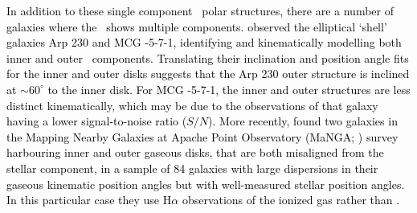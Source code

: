 \documentclass[fleqn,usenatbib]{mnras}
\newcommand{\hi}{\text{H\,\sc{i}}}
\newcommand{\KS}[1]{\textcolor{black}{#1}}
\begin{document}


\textcolor{black}{In addition to these single component \hi\ polar structures, there are a number of galaxies where the \hi\ shows multiple components.  \citet{Schiminovich2013} observed the elliptical `shell' galaxies Arp 230 and MCG -5-7-1, \KS{identifying and kinematically modelling both inner and outer \hi\ components.}  Translating their inclination and position angle fits for the inner and outer disks suggests that the Arp 230 outer structure is inclined at $\sim 60^{\circ}$ to the inner disk. For MCG -5-7-1, the inner and outer structures are less distinct kinematically, which may be due to the observations of that galaxy having a lower signal-to-noise ratio ($S/N$).  More recently, \citet{Cao2022} found two galaxies in the Mapping Nearby Galaxies at Apache Point Observatory (MaNGA; \citealt{Bundy2015}) survey \KS{harbouring inner and outer gaseous disks, that are both misaligned from the stellar component, in} a sample of 84 galaxies with large dispersions in their gaseous kinematic position angles but with well-measured stellar position angles. In this particular case they use H$\alpha$ observations of the ionized gas rather than \hi.}
\end{document}
